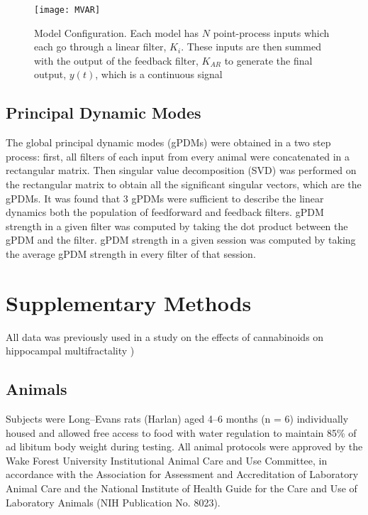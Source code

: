 \documentclass[11pt,a4paper,final]{article}
\begin{document}
\begin{figure}[!ht]
\centering
\texttt{[image: MVAR]}
\caption[Model configuration schema]{
Model Configuration. Each model has $N$ point-process inputs which each go through a linear filter, $K_i$. These inputs are then summed with the output of the feedback filter, $K_{AR}$ to generate the final output, $y(t)$, which is a continuous signal}
\label{fMVAR}
\end{figure}

    \subsection{Principal Dynamic Modes \label{PDMs}}
The global principal dynamic modes (gPDMs) were obtained in a two step process: first, all filters of each input from every animal were concatenated in a rectangular matrix. Then  singular value decomposition (SVD) was performed on the rectangular matrix to obtain all the significant singular vectors, which are the gPDMs.
It was found that 3 gPDMs were sufficient to describe the linear dynamics both the population of feedforward and feedback filters.
gPDM strength in a given filter was computed by taking the dot product between the gPDM and the filter.
gPDM strength in a given session was computed by taking the average gPDM strength in every filter of that session.



\appendix

\section{Supplementary Methods \label{SM}}

All data was previously used in a study on the effects of cannabinoids on hippocampal multifractality \citep{dustin14,dustin15})

    \subsection{Animals}
Subjects were Long–Evans rats (Harlan) aged 4–6 months (n = 6) individually housed and allowed free access to food with water regulation to maintain 85\% of ad libitum body weight during testing.
All animal protocols were approved by the Wake Forest University Institutional Animal Care and Use Committee, in accordance with the Association for Assessment and Accreditation of Laboratory Animal Care and the National Institute of Health Guide for the Care and Use of Laboratory Animals (NIH Publication No. 8023).
\end{document}
